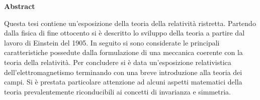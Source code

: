 \vspace*{10pt}
\begin{center}
	\large\textbf{Abstract}\normalsize
\end{center}
\vspace*{10pt}
\begin{changemargin}{1cm}{1cm}
Questa tesi contiene un'esposizione della teoria della relatività ristretta. Partendo dalla fisica di fine ottocento si è descritto lo sviluppo della teoria a partire dal lavoro di Einstein del 1905.  In seguito si sono considerate le principali caratteristiche possedute dalla formulazione di una meccanica coerente con la teoria della relatività. Per concludere si è data un'esposizione relativistica dell'elettromagnetismo terminando con una breve introduzione alla teoria dei campi.
Si è prestata particolare attenzione ad alcuni aspetti matematici della teoria prevalentemente riconducibili ai concetti di invarianza e simmetria.
\end{changemargin}